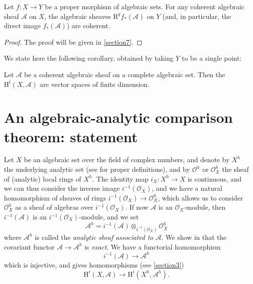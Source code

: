 \documentclass{article}
\theoremstyle{plain}
\newenvironment{theorem}[1]
    {\renewcommand\theinnercustomtheorem{#1}\innercustomtheorem}
    {\endinnercustomtheorem}
\newenvironment{corollary}[1]
    {\renewcommand\theinnercustomcorollary{#1}\innercustomcorollary}
    {\endinnercustomcorollary}
\theoremstyle{definition}
\newcommand{\sh}[1]{{\mathscr{#1}}}
\newcommand{\HH}{\mathrm{H}}
\newcommand{\RR}{\mathrm{R}}
\begin{document}
\begin{theorem}{4}
\label{theorem4}
  Let $f\colon X\to Y$ be a proper morphism of algebraic sets.
  For any coherent algebraic sheaf $\sh{A}$ on $X$, the algebraic sheaves $\RR^qf_*(\sh{A})$ on $Y$ (and, in particular, the direct image $f_*(\sh{A})$) are coherent.
\end{theorem}

\begin{proof}
  The proof will be given in \cref{section7}.
\end{proof}

We state here the following corollary, obtained by taking $Y$ to be a single point:

\begin{corollary}{\!\!}
  Let $\sh{A}$ be a coherent algebraic sheaf on a complete algebraic set.
  Then the $\HH^i(X,\sh{A})$ are vector spaces of finite dimension.
\end{corollary}


\section{An algebraic-analytic comparison theorem: statement}
\label{section6}

Let $X$ be an algebraic set over the field of complex numbers, and denote by $X^h$ the underlying analytic set (see \cite{2} for proper definitions), and by $\sh{O}^h$ or $\sh{O}_X^h$ the sheaf of (analytic) local rings of $X^h$.
The identity map $i_X\colon X^h\to X$ is continuous, and we can thus consider the inverse image $i^{-1}(\sh{O}_X)$, and we have a natural homomorphism of sheaves of rings $i^{-1}(\sh{O}_X)\to\sh{O}_X^h$, which allows us to consider $\sh{O}_X^h$ as a sheaf of algebras over $i^{-1}(\sh{O}_X)$.
If now $\sh{A}$ is an $\sh{O}_X$-module, then $i^{-1}(\sh{A})$ is an $i^{-1}(\sh{O}_X)$-module, and we set
\[
  \sh{A}^h = i^{-1}(\sh{A})\otimes_{i^{-1}(\sh{O}_X)}\sh{O}_X^h
\]
where $\sh{A}^h$ is called the \emph{analytic sheaf associated to $\sh{A}$}.
We show in \cite{2} that the covariant functor $\sh{A}\to\sh{A}^h$ is \emph{exact}.
We have a functorial homomorphism
\[
  i^{-1}(\sh{A}) \to \sh{A}^h
\]
which is injective, and gives homomorphisms (see \cref{section3})
\[
\label{equation2}
  \HH^i(X,\sh{A}) \to \HH^i(X^h,\sh{A}^h).
  \tag{2}
\]
\end{document}
